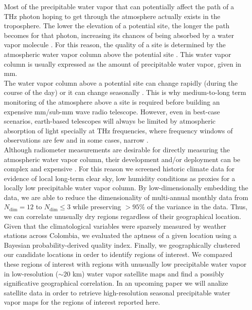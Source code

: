 \documentclass[a4paper,fleqn,usenatbib]{mnras}
\begin{document}
Most of the precipitable water vapor that can potentially affect the path of a THz photon hoping to get through the atmosphere actually exists in the troposphere. The lower the elevation of a potential site, the longer the path becomes for that photon, increasing its chances of being absorbed by a water vapor molecule \citep{liebe1989mpm,linecont,lababs}. For this reason, the quality of a site is determined by the atmospheric water vapor column above the potential site \citep{mkradio,southpole3,he2012,atacama}. This water vapor column is usually expressed as the amount of precipitable water vapor, given in mm.\\

The water vapor column above a potential site can change rapidly (during the course of the day) or it can change seasonally \citep{arm2013,caumont2016}. This is why medium-to-long term monitoring of the atmosphere above a site is required before building an expensive mm/sub-mm wave radio telescope. However, even in best-case scenarios, earth-based telescopes will always be limited by atmospheric absorption of light specially at THz frequencies, where frequency windows of observations are few and in some cases, narrow \citep{arrlim,limits}. \\

Although radiometer measurements are desirable for directly measuring the atmospheric water vapor column, their development and/or deployment can be complex and expensive \citep{radiopro,receiver}. For this reason we screened historic climate data for evidence of local long-term clear sky, low humidity conditions as proxies for a locally low precipitable water vapor column. By low-dimensionally embedding the data, we are able to reduce the dimensionality of multi-annual monthly data from $N_\mathrm{dim}=12$ to $N_\mathrm{dim}\le3$ while preserving $>95$\% of the variance in the data. Thus, we can correlate unusually dry regions regardless of their geographical location. Given that the climatological variables were sparsely measured by weather stations across Colombia, we evaluated the aptness of a given location using a Bayesian probability-derived quality index. Finally, we geographically clustered our candidate locations in order to identify regions of interest. We compared these regions of interest with regions with unusually low precipitable water vapor in low-resolution ($\sim20$ km) water vapor satellite maps \citep{suen2016} and find a possibly significative geographical correlation.  In an upcoming paper we will analize satellite data in order to retrieve high-resolution seasonal precipitable water vapor maps for the regions of interest reported here.\\
\end{document}
